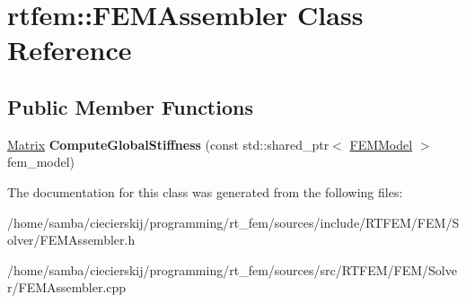 \hypertarget{classrtfem_1_1FEMAssembler}{}\section{rtfem\+:\+:F\+E\+M\+Assembler Class Reference}
\label{classrtfem_1_1FEMAssembler}
\subsection*{Public Member Functions}
\begin{DoxyCompactItemize}
\item 
\mbox{\label{classrtfem_1_1FEMAssembler_acfa55c7a2eb8a1c7b1e3b5ffc810c3b0}} 
\hyperlink{classrtfem_1_1Matrix}{Matrix} {\bfseries Compute\+Global\+Stiffness} (const std\+::shared\+\_\+ptr$<$ \hyperlink{classrtfem_1_1FEMModel}{F\+E\+M\+Model} $>$ fem\+\_\+model)
\end{DoxyCompactItemize}


The documentation for this class was generated from the following files\+:\begin{DoxyCompactItemize}
\item 
/home/samba/ciecierskij/programming/rt\+\_\+fem/sources/include/\+R\+T\+F\+E\+M/\+F\+E\+M/\+Solver/F\+E\+M\+Assembler.\+h\item 
/home/samba/ciecierskij/programming/rt\+\_\+fem/sources/src/\+R\+T\+F\+E\+M/\+F\+E\+M/\+Solver/F\+E\+M\+Assembler.\+cpp\end{DoxyCompactItemize}
